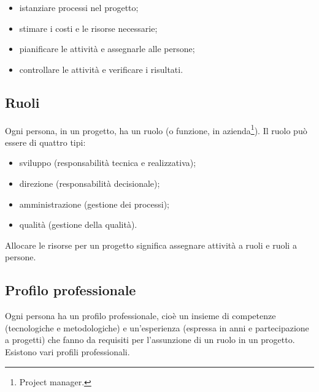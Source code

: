 \documentclass[a4paper]{article}
\begin{document}
	\begin{itemize}
		
			
	\item istanziare processi nel progetto;
			
	\item stimare i costi e le risorse necessarie;
			
	\item pianificare le attività e assegnarle alle persone;
			
	\item controllare le attività e verificare i risultati.
		
	\end{itemize}


		
	\subsection{Ruoli}

		
Ogni persona, in un progetto, ha un ruolo (o funzione, in azienda\footnote{Project manager.}). Il ruolo può essere di quattro tipi:
		
	\begin{itemize}
		
			
	\item sviluppo (responsabilità tecnica e realizzativa);
			
	\item direzione (responsabilità decisionale);
			
	\item amministrazione (gestione dei processi);
			
	\item qualità (gestione della qualità).
		
	\end{itemize}

		
Allocare le risorse per un progetto significa assegnare attività a ruoli e ruoli a persone.

		
	\subsection{Profilo professionale}

		
Ogni persona ha un profilo professionale, cioè un insieme di competenze (tecnologiche e metodologiche) e un'esperienza (espressa in anni e partecipazione a progetti) che fanno da requisiti per l'assunzione di un ruolo in un progetto. Esistono vari profili professionali.
		
\end{document}

